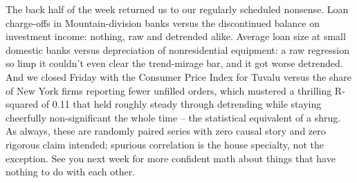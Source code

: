 The back half of the week returned us to our regularly scheduled nonsense. Loan charge-offs in Mountain-division banks versus the discontinued balance on investment income: nothing, raw and detrended alike. Average loan size at small domestic banks versus depreciation of nonresidential equipment: a raw regression so limp it couldn't even clear the trend-mirage bar, and it got worse detrended. And we closed Friday with the Consumer Price Index for Tuvalu versus the share of New York firms reporting fewer unfilled orders, which mustered a thrilling R-squared of 0.11 that held roughly steady through detrending while staying cheerfully non-significant the whole time -- the statistical equivalent of a shrug. As always, these are randomly paired series with zero causal story and zero rigorous claim intended; spurious correlation is the house specialty, not the exception. See you next week for more confident math about things that have nothing to do with each other.
